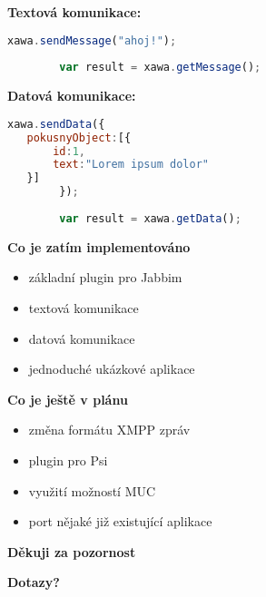 \documentclass[9pt]{beamer}
\begin{document}

\begin{frame}[fragile]


	\textbf{Textová komunikace:}

	\begin{lstlisting}[language=Javascript]
		xawa.sendMessage("ahoj!");
		
		var result = xawa.getMessage();
	\end{lstlisting}
	
	\vspace{5mm}
	
	\textbf{Datová komunikace:}
	
	\begin{lstlisting}[language=Javascript]
		xawa.sendData({
   pokusnyObject:[{
       id:1,
       text:"Lorem ipsum dolor"
   }]
		});
		
		var result = xawa.getData();
	\end{lstlisting}
\end{frame}

\begin{frame}

	\textbf{Co je zatím implementováno}
	\begin{itemize}
		\item základní plugin pro Jabbim
		\item textová komunikace
		\item datová komunikace
		\item jednoduché ukázkové aplikace
	\end{itemize}
	
	\vspace{5mm}
	
	\textbf{Co je ještě v plánu}
	\begin{itemize}
		\item změna formátu XMPP zpráv
		\item plugin pro Psi
		\item využití možností MUC
		\item port nějaké již existující aplikace
	\end{itemize}

\end{frame}

\begin{frame}
	\begin{center}
	\textbf{\LARGE{Děkuji za pozornost}}
	
	\vspace{5mm}
	\textbf{Dotazy?}
	\end{center}
\end{frame}
\end{document}
